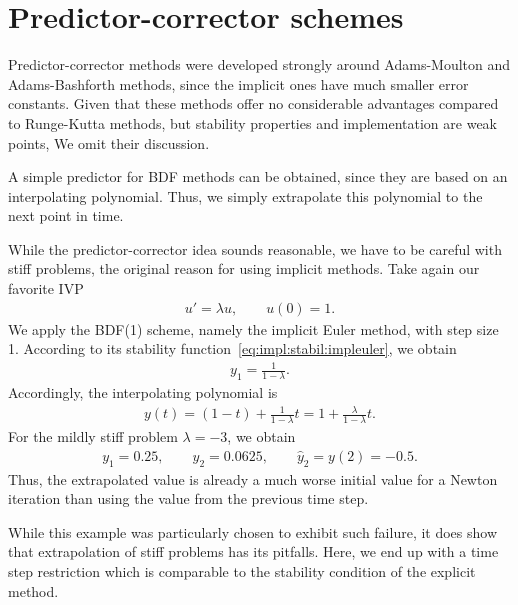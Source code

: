 \section{Predictor-corrector schemes}


\begin{remark}
  Predictor-corrector methods were developed strongly around
  Adams-Moulton and Adams-Bashforth methods, since the implicit ones
  have much smaller error constants. Given that these methods offer no
  considerable advantages compared to Runge-Kutta methods, but
  stability properties and implementation are weak points, We omit
  their discussion.

  A simple predictor for BDF methods can be obtained, since they are
  based on an interpolating polynomial. Thus, we simply extrapolate
  this polynomial to the next point in time.
\end{remark}

\begin{example}
  While the predictor-corrector idea sounds reasonable, we have to be
  careful with stiff problems, the original reason for using implicit
  methods. Take again our favorite IVP
  \begin{gather*}
    u' = \lambda u,
    \qquad u(0) = 1.
  \end{gather*}
  We apply the BDF(1) scheme, namely the implicit Euler method, with
  step size 1. According to its stability
  function~\eqref{eq:impl:stabil:impleuler}, we obtain
  \begin{gather*}
    y_1 = \frac1{1-\lambda}.
  \end{gather*}
  Accordingly, the interpolating polynomial is
  \begin{gather*}
    y(t) = (1-t) + \frac1{1-\lambda} t = 1 + \frac{\lambda}{1-\lambda}t.
  \end{gather*}
  For the mildly stiff problem $\lambda = -3$, we obtain
  \begin{gather*}
    y_1 = 0.25, \qquad y_2 = 0.0625,
    \qquad \hat y_2 = y(2) = -0.5.
  \end{gather*}
  Thus, the extrapolated value is already a much worse initial value
  for a Newton iteration than using the value from the previous time
  step.
  
  While this example was particularly chosen to exhibit such failure,
  it does show that extrapolation of stiff problems has its
  pitfalls. Here, we end up with a time step restriction which is
  comparable to the stability condition of the explicit method.
\end{example}


